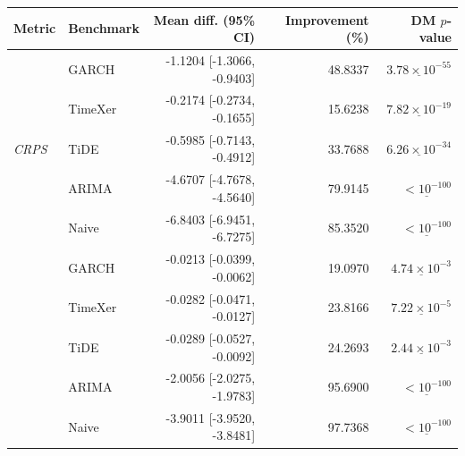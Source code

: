 \begin{tabular}{llrrr}
\toprule
Metric & Benchmark & Mean diff. (95\% CI) & Improvement (\%) & DM $p$-value \\
\midrule
\multirow{5}{*}{\textit{CRPS}}
 & GARCH & -1.1204 [-1.3066, -0.9403] & 48.8337 & $\underline{3.78 \times 10^{-55}}$ \\
 & TimeXer & -0.2174 [-0.2734, -0.1655] & 15.6238 & $\underline{7.82 \times 10^{-19}}$ \\
 & TiDE & -0.5985 [-0.7143, -0.4912] & 33.7688 & $\underline{6.26 \times 10^{-34}}$ \\
 & ARIMA & -4.6707 [-4.7678, -4.5640] & 79.9145 & $\underline{< 10^{-100}}$ \\
 & Naive & -6.8403 [-6.9451, -6.7275] & 85.3520 & $\underline{< 10^{-100}}$ \\
\addlinespace \midrule
\multirow{5}{*}{\textit{twCRPS}}
 & GARCH & -0.0213 [-0.0399, -0.0062] & 19.0970 & $\underline{4.74 \times 10^{-3}}$ \\
 & TimeXer & -0.0282 [-0.0471, -0.0127] & 23.8166 & $\underline{7.22 \times 10^{-5}}$ \\
 & TiDE & -0.0289 [-0.0527, -0.0092] & 24.2693 & $\underline{2.44 \times 10^{-3}}$ \\
 & ARIMA & -2.0056 [-2.0275, -1.9783] & 95.6900 & $\underline{< 10^{-100}}$ \\
 & Naive & -3.9011 [-3.9520, -3.8481] & 97.7368 & $\underline{< 10^{-100}}$ \\
\bottomrule
\end{tabular}
